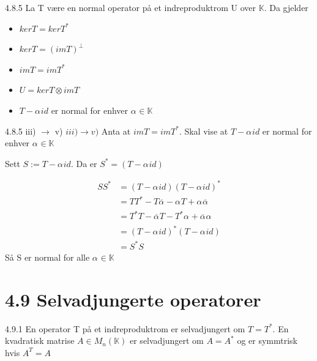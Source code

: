 \documentclass[a4paper,norsk]{article}
\begin{document}
\begin{theorembox}{4.8.5}{}
La T være en normal operator på et indreproduktrom U over $ \mathbb{K} $. Da gjelder
\begin{itemize}
    \item $ ker T = ker T^* $ 
    \item $ ker T = \left( imT \right)^{\bot}  $ 
    \item $ imT = imT^* $ 
    \item $ U = kerT \otimes im T$ 
    \item $ T - \alpha_{}^{} id   $  er normal for enhver $ \alpha_{}^{} \in \mathbb{K} $ 
\end{itemize}

\begin{proofbox}{4.8.5 iii) $ \to $ v)}{}
$ iii) \rightarrow v) $ Anta at $ imT = imT^* $. Skal vise at $ T - \alpha_{}^{} id $ er normal for enhver $ \alpha_{}^{} \in \mathbb{K} $ 

Sett $ S:= T - \alpha_{}^{} id $. Da er $ S^* = \left( T-\alpha_{}^{} id \right)  $ 

\begin{align*}
    SS^* &= \left( T-\alpha_{}^{} id \right) \left( T-\alpha_{}^{} id \right) ^* \\
    &= TT^* - T\overline{\alpha_{}^{} } - \alpha_{}^{} T + \alpha_{}^{} \overline{\alpha_{}^{} } \\
    &=T^*T - \overline{\alpha_{}^{} } T - T^* \alpha_{}^{} + \overline{\alpha_{}^{} } \alpha_{}^{}  \\
    &= \left( T-\alpha_{}^{} id \right) ^* \left( T- \alpha_{}^{} id \right) \\
    &= S^* S
\end{align*}
Så S er normal for alle $ \alpha_{}^{} \in \mathbb{K} $ 
\end{proofbox}

\end{theorembox}

\section*{4.9 Selvadjungerte operatorer}


\begin{definitionbox}{4.9.1}{}
    En operator T på et indreproduktrom er selvadjungert om $ T = T^* $. En kvadratisk matrise $ A \in M_n(\mathbb{K}) $ er selvadjungert om $ A = A^* $ og er symmtrisk hvis $ A^T = A $ 
\end{definitionbox}
\end{document}
